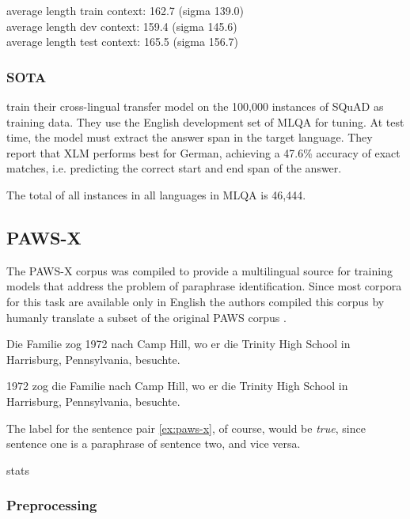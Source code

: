 average length train context: 162.7 (sigma 139.0) \\
average length dev context: 159.4 (sigma 145.6) \\
average length test context: 165.5 (sigma 156.7)

\subsubsection{SOTA}

\cite{lewis2019mlqa} train their cross-lingual transfer model on the 100,000 instances of SQuAD 
\cite{rajpurkar2016squad} as training data.
They use the English development set of MLQA for tuning.
At test time, the model must extract the answer span in the target language.
They report that XLM performs best for German, achieving a 47.6\% accuracy of exact matches, i.e. 
predicting the correct start and end span of the answer.

The total of all instances in all languages in MLQA is 46,444.

\subsection{PAWS-X}

The PAWS-X corpus \cite{yang2019paws} was compiled to provide a multilingual source for training 
models that address the problem of paraphrase identification. 
Since most corpora for this task are available only in English the authors compiled this corpus by 
humanly translate a subset of the original PAWS corpus \cite{zhang2019paws}.

\begin{examples}
	\label{ex:paws-x}
	\item Die Familie zog 1972 nach Camp Hill, wo er die Trinity High School in Harrisburg, Pennsylvania, besuchte.
		
	1972 zog die Familie nach Camp Hill, wo er die Trinity High School in Harrisburg, Pennsylvania, besuchte.
\end{examples}

The label for the sentence pair \ref{ex:paws-x}, of course, would be \emph{true}, since sentence 
one is a paraphrase of sentence two, and vice versa.


stats

\subsubsection{Preprocessing}

